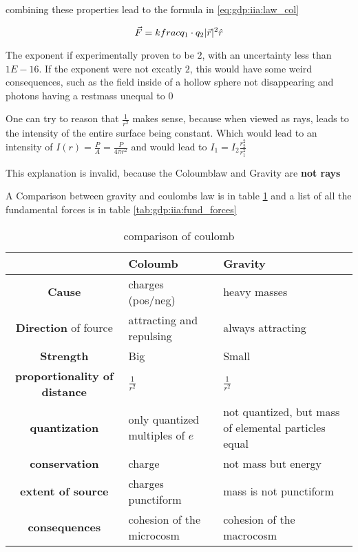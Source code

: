 combining these properties lead to the formula in \ref{eq:gdp:iia:law_col}

\begin{equation}
    \label{eq:gdp:iia:law_col}
    \vec{F} = k frac{q_1\cdot q_2}{\lvert \vec{r} \rvert^2} \hat{r} 
\end{equation}

The exponent if experimentally proven to be $2$,
    with an uncertainty less than $1E-16$.
If the exponent were not excatly $2$,
    this would have some weird consequences,
    such as the field inside of a hollow sphere not disappearing and
    photons having a restmass unequal to $0$

One can try to reason that $\frac{1}{r^2}$ makes sense,
    because when viewed as rays, 
    leads to the intensity of the entire surface being constant.
Which would lead to an intensity of $I(r) = \frac{P}{A} = \frac{P}{4\pi r^2}$
and would lead to $I_1 = I_2 \frac{r_2^2}{r_1^2}$

This explanation is invalid,
    because the Coloumblaw and Gravity are \textbf{not rays}


A Comparison between gravity and coulombs law is in table \ref{tab:gdp:iia:coulomb_gravity} 
    and a list of all the fundamental forces is in table \ref{tab:gdp:iia:fund_forces}
\begin{table}
    \begin{tabularx}{1.25\textwidth}{|c | l | X|}
        \hline
        & \textbf{Coloumb} & \textbf{Gravity}\\ 
        \hline
        \textbf{Cause} & charges (pos/neg) & heavy masses \\ 
        \textbf{Direction} of fource & attracting and repulsing & always attracting \\ 
        \textbf{Strength} & Big & Small \\ 
        \textbf{proportionality of distance} &  $\frac{1}{r^2}$ & $\frac{1}{r^2}$ \\
        \textbf{quantization} & only quantized multiples of $e$ & not quantized, but mass of elemental particles equal \\ 
        \textbf{conservation} & charge & not mass but energy \\ 
        \textbf{extent of source} & charges punctiform & mass is not punctiform \\ 
        \textbf{consequences} & cohesion of the microcosm & cohesion of the macrocosm \\ 
        \hline
    \end{tabularx}
    \caption{comparison of coulomb}
    \label{tab:gdp:iia:coulomb_gravity}
\end{table}


